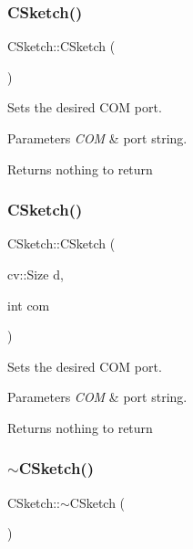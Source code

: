 \subsubsection{\texorpdfstring{C\+Sketch()}{CSketch()}\hspace{0.1cm}{\footnotesize\ttfamily [1/2]}}
{\footnotesize\ttfamily C\+Sketch\+::\+C\+Sketch (\begin{DoxyParamCaption}{ }\end{DoxyParamCaption})}



Sets the desired C\+OM port. 


\begin{DoxyParams}{Parameters}
{\em C\+OM} & port string. \\
\hline
\end{DoxyParams}
\begin{DoxyReturn}{Returns}
nothing to return 
\end{DoxyReturn}
\hypertarget{class_c_sketch_ad18ac5668b3f4994b2114213f656341f}{}\label{class_c_sketch_ad18ac5668b3f4994b2114213f656341f} 
\subsubsection{\texorpdfstring{C\+Sketch()}{CSketch()}\hspace{0.1cm}{\footnotesize\ttfamily [2/2]}}
{\footnotesize\ttfamily C\+Sketch\+::\+C\+Sketch (\begin{DoxyParamCaption}\item[{cv\+::\+Size}]{d,  }\item[{int}]{com }\end{DoxyParamCaption})}



Sets the desired C\+OM port. 


\begin{DoxyParams}{Parameters}
{\em C\+OM} & port string. \\
\hline
\end{DoxyParams}
\begin{DoxyReturn}{Returns}
nothing to return 
\end{DoxyReturn}
\hypertarget{class_c_sketch_aca8c70005a0bca496ea9574e4da47f65}{}\label{class_c_sketch_aca8c70005a0bca496ea9574e4da47f65} 
\subsubsection{\texorpdfstring{$\sim$\+C\+Sketch()}{~CSketch()}}
{\footnotesize\ttfamily C\+Sketch\+::$\sim$\+C\+Sketch (\begin{DoxyParamCaption}{ }\end{DoxyParamCaption})}



